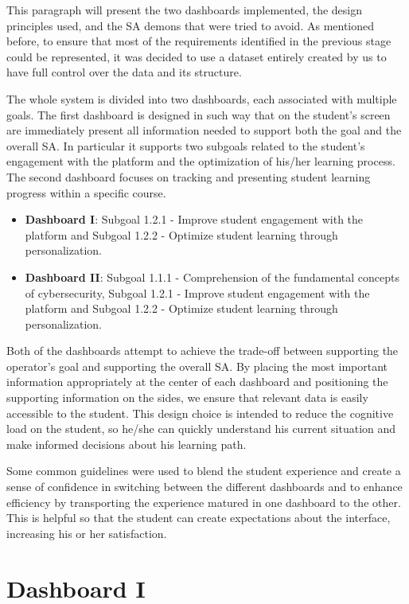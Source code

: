 This paragraph will present the two dashboards implemented, the design principles used, and the SA demons that were tried to avoid. As mentioned before, to ensure that most of the requirements identified in the previous stage could be represented, it was decided to use a dataset entirely created by us to have full control over the data and its structure.

The whole system is divided into two dashboards, each associated with multiple goals. The first dashboard is designed in such way that on the student's screen are immediately present all information needed to support both the goal and the overall SA. In particular it supports two subgoals related to the student's engagement with the platform and the optimization of his/her learning process. 
The second dashboard focuses on tracking and presenting student learning progress within a specific course.

\begin{itemize}
    \item \textbf{Dashboard I}: Subgoal 1.2.1 - Improve student engagement with the platform and Subgoal 1.2.2 - Optimize student learning through personalization.
    \item \textbf{Dashboard II}: Subgoal 1.1.1 - Comprehension of the fundamental concepts of cybersecurity, Subgoal 1.2.1 - Improve student engagement with the platform and Subgoal 1.2.2 - Optimize student learning through personalization.
\end{itemize} 

Both of the dashboards attempt to achieve the trade-off between supporting the operator's goal and supporting the overall SA. By placing the most important information appropriately at the center of each dashboard and positioning the supporting information on the sides, we ensure that relevant data is easily accessible to the student. This design choice is intended to reduce the cognitive load on the student, so he/she can quickly understand his current situation and make informed decisions about his learning path.

Some common guidelines were used to blend the student experience and create a sense of confidence in switching between the different dashboards and to enhance efficiency by transporting the experience matured in one dashboard to the other. This is helpful so that the student can create expectations about the interface, increasing his or her satisfaction.

\section{Dashboard I}


